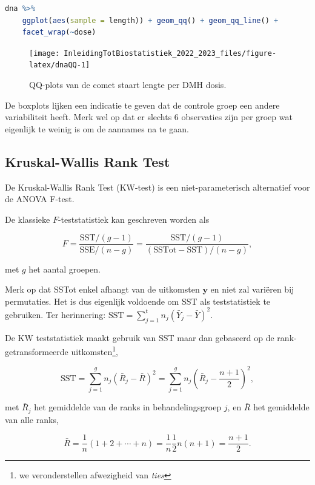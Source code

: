 \documentclass[
  12pt,dutch,coursenotes]{book}
\begin{document}
\begin{lstlisting}[language=R]
dna %>%
    ggplot(aes(sample = length)) + geom_qq() + geom_qq_line() +
    facet_wrap(~dose)
\end{lstlisting}

\begin{figure}

{\centering \texttt{[image: InleidingTotBiostatistiek\_2022\_2023\_files/figure-latex/dnaQQ-1]} 

}

\caption{QQ-plots van de comet staart lengte per DMH dosis.}\label{fig:dnaQQ}
\end{figure}

De boxplots lijken een indicatie te geven dat de controle groep een andere variabiliteit heeft.
Merk wel op dat er slechts 6 observaties zijn per groep wat eigenlijk te weinig is om de aannames na te gaan.

\hypertarget{kruskal-wallis-rank-test}{%
\subsection{Kruskal-Wallis Rank Test}\label{kruskal-wallis-rank-test}}

De Kruskal-Wallis Rank Test (KW-test) is een niet-parameterisch alternatief voor de ANOVA F-test.

De klassieke \(F\)-teststatistiek kan geschreven worden als

\[
    F = \frac{\text{SST}/(g-1)}{\text{SSE}/(n-g)} = \frac{\text{SST}/(g-1)}{(\text{SSTot}-\text{SST})/(n-g)} ,
  \]

met \(g\) het aantal groepen.

Merk op dat SSTot enkel afhangt van de uitkomsten \(\mathbf{y}\) en niet zal variëren bij permutaties. Het is dus eigenlijk voldoende om SST als teststatistiek te gebruiken. Ter herinnering: \(\text{SST}=\sum_{j=1}^t n_j(\bar{Y}_j-\bar{Y})^2\).

De KW teststatistiek maakt gebruik van SST maar dan gebaseerd op de rank-getransformeerde uitkomsten\footnote{we veronderstellen afwezigheid van \emph{ties}},

\[
     \text{SST} = \sum_{j=1}^g n_j \left(\bar{R}_j - \bar{R}\right)^2 = \sum_{j=1}^g n_j \left(\bar{R}_j - \frac{n+1}{2}\right)^2 ,
  \]

met \(\bar{R}_j\) het gemiddelde van de ranks in behandelingsgroep \(j\), en \(\bar{R}\) het gemiddelde van alle ranks,

\[
    \bar{R} = \frac{1}{n}(1+2+\cdots + n) = \frac{1}{n}\frac{1}{2}n(n+1) = \frac{n+1}{2}.
  \]
\end{document}
